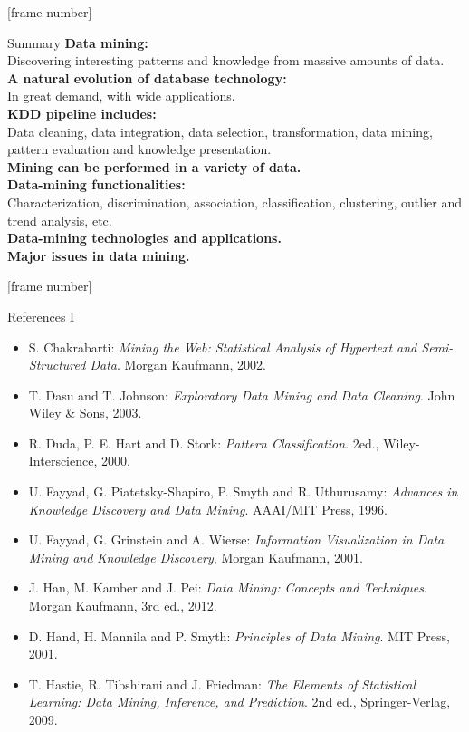 \documentclass[aspectratio=169,t]{beamer}
\begin{document}
 {
    [frame number]
    \begin{frame}{Summary}
    \textbf{Data mining:}\\
    Discovering interesting patterns and knowledge from massive amounts of data.\\[0.2cm]

    \textbf{A natural evolution of database technology:}\\
    In great demand, with wide applications.\\[0.2cm]

    \textbf{KDD pipeline includes:}\\
    Data cleaning, data integration, data selection, transformation, data mining, pattern evaluation and knowledge presentation.\\[0.2cm]

    \textbf{Mining can be performed in a variety of data.}\\
    \textbf{Data-mining functionalities:}\\
    Characterization, discrimination, association, classification, clustering, outlier and trend analysis, etc.\\[0.2cm]

    \textbf{Data-mining technologies and applications.}\\
    \textbf{Major issues in data mining.}\\
    \end{frame}
  }


  {
    [frame number]
    \begin{frame}{References I}
        \begin{itemize}
          \item S. Chakrabarti: \emph{Mining the Web: Statistical Analysis of Hypertext and Semi-Structured Data}. Morgan Kaufmann, 2002.
          \item T. Dasu and T. Johnson: \emph{Exploratory Data Mining and Data Cleaning}. John Wiley \& Sons, 2003.
          \item R. Duda, P. E. Hart and D. Stork: \emph{Pattern Classification}. 2ed., Wiley-Interscience, 2000.
          \item U. Fayyad, G. Piatetsky-Shapiro, P. Smyth and R. Uthurusamy: \emph{Advances in Knowledge Discovery and Data Mining}. AAAI/MIT Press, 1996.
          \item U. Fayyad, G. Grinstein and A. Wierse: \emph{Information Visualization in Data Mining and Knowledge Discovery}, Morgan Kaufmann, 2001.
          \item J. Han, M. Kamber and J. Pei: \emph{Data Mining: Concepts and Techniques}. Morgan Kaufmann, 3rd ed., 2012.
          \item D. Hand, H. Mannila and P. Smyth: \emph{Principles of Data Mining}. MIT Press, 2001.
          \item T. Hastie, R. Tibshirani and J. Friedman: \emph{The Elements of Statistical Learning: Data Mining, Inference, and Prediction}. 2nd ed., Springer-Verlag, 2009.
        \end{itemize}
    \end{frame}
  }
\end{document}
